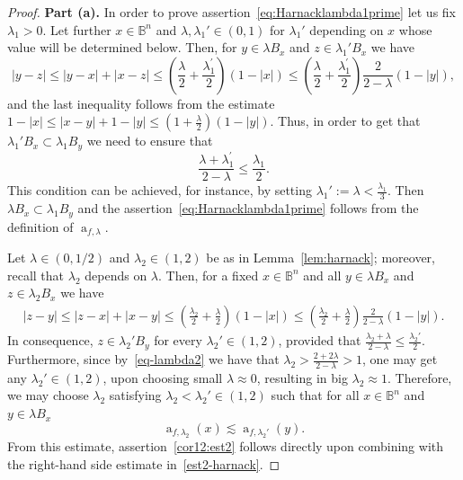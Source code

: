 \documentclass[10pt,a4paper]{amsart}
\newcommand{\B}{\mathbb{B}^n}
\renewcommand{\a}{\operatorname{a}}
\newcommand{\komI}[1]{{\bf \red [\refstepcounter{komcounter}\thekomcounter (by I): #1]}}
\newcommand{\red}{\color{red}}
\begin{document}
\begin{proof}
{\bf Part (a).} In order to prove assertion~\eqref{eq:Harnacklambda1prime} let us fix $\lambda_1 >0$. Let further $x\in \B$ and $\lambda , \lambda_1' \in (0,1)$ for $\lambda_1'$ depending on $x$ whose value will be determined below. Then, for $y\in \lambda B_x$ and $z\in \lambda_1' B_x$ we have
$$
|y-z|\leq |y-x|+|x-z|\leq \left( \frac\lambda 2 + \frac{\lambda_1^\prime}{2}\right) (1-|x|)\leq \left( \frac\lambda 2 + \frac{\lambda_1^\prime}{2}\right)\frac{2}{2-\lambda } (1-|y|),
$$
and the last inequality follows from the estimate $1-|x|\leq |x-y|+1-|y|\leq (1+\frac{\lambda}{2})(1-|y|)$.
Thus, in order to get that $\lambda_1' B_x\subset \lambda_1 B_y$ we need to ensure that
$$
\frac{\lambda + \lambda_1^\prime }{2-\lambda}\leq \frac{\lambda_1}{2}.
$$
This condition can be achieved, for instance, by setting $\lambda_1':=\lambda <\frac{\lambda_1}{3}$. Then $\lambda  B_x\subset \lambda_1 B_y$ and the assertion~\eqref{eq:Harnacklambda1prime} follows from the definition of $\a_{f,\lambda}$. 
\medskip
		
 Let  $\lambda\in (0,1/2)$ and $\lambda_2\in (1,2)$ be as in Lemma~\ref{lem:harnack}; moreover, recall that $\lambda_2$ depends on $\lambda$. Then, for a fixed $x\in \B$ and all $y\in\lambda B_x$ and $z\in \lambda_2 B_x$ we have
	\begin{align*}
		|z-y|\leq |z-x|+|x-y|\leq \left( \frac{\lambda_2}{2}+\frac{\lambda}{2}\right) (1-|x|)\leq \left( \frac{\lambda_2}{2}+\frac{\lambda}{2}\right)\frac{2}{2-\lambda}(1-|y|).
	\end{align*}
In consequence, $z\in \lambda_2' B_y$ for every $\lambda_2' \in (1,2)$, provided that $\frac{\lambda_2+\lambda}{2-\lambda}\leq\frac{\lambda_2'}{2}$. Furthermore, since by~\eqref{eq-lambda2} we have that $\lambda_2> \frac{2+2\lambda}{2-\lambda}>1$, one may get any $\lambda_2' \in (1,2)$, upon choosing small $\lambda \approx 0$, resulting in big $\lambda_2\approx 1$.
Therefore, we may choose $\lambda_2$ satisfying $\lambda_2<\lambda_2' \in (1,2)$ such that for all $x\in \B$ and $y\in \lambda B_x$ 
\begin{equation*}%
    \a_{f,\lambda_2}(x) \lesssim \a_{f,\lambda_2'}(y).
\end{equation*}
From this estimate, assertion~\eqref{cor12:est2} follows directly upon combining with the right-hand side estimate in~\eqref{est2-harnack}.
\medskip


\end{proof}
\end{document}
